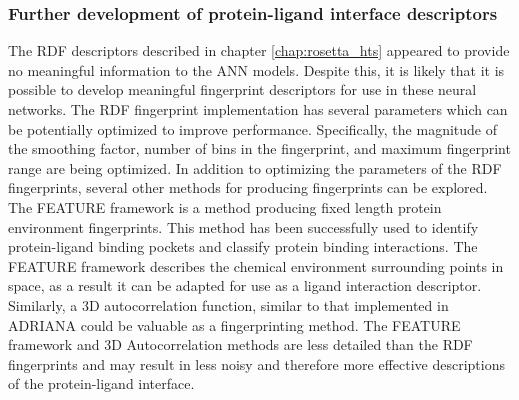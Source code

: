 \subsubsection{Further development of protein-ligand interface descriptors}
The RDF descriptors described in chapter \ref{chap:rosetta_hts} appeared to provide no meaningful information to the ANN models.
Despite this, it is likely that it is possible to develop meaningful fingerprint descriptors for use in these neural networks.
The RDF fingerprint implementation has several parameters which can be potentially optimized to improve performance.
Specifically, the magnitude of the smoothing factor, number of bins in the fingerprint, and maximum fingerprint range are being optimized.
In addition to optimizing the parameters of the RDF fingerprints, several other methods for producing fingerprints can be explored.
The FEATURE framework\citep{Halperin:2008ce} is a method producing fixed length protein environment fingerprints.
This method has been successfully used to identify protein-ligand binding pockets and classify protein binding interactions. 
The FEATURE framework describes the chemical environment surrounding points in space, as a result it can be adapted for use as a ligand interaction descriptor.
Similarly, a 3D autocorrelation function, similar to that implemented in ADRIANA\citep{Code:2011uf} could be valuable as a fingerprinting method.
The FEATURE framework and 3D Autocorrelation methods are less detailed than the \ac{RDF} fingerprints and may result in less noisy and therefore more effective descriptions of the protein-ligand interface.

